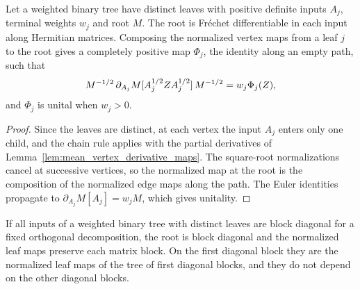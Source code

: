 \begin{theorem}\label{thm:mean_tree_leaf_maps}
    \leanok
    Let a weighted binary tree have distinct leaves with positive definite inputs
    $A_j$, terminal weights $w_j$ and root $M$. The root is Fr\'echet
    differentiable in each input along Hermitian matrices. Composing the
    normalized vertex maps from a leaf $j$ to the root gives a completely
    positive map $\Phi_j$, the identity along an empty path, such that
    \begin{align}
        M^{-1/2}\,\partial_{A_j}M[A_j^{1/2}ZA_j^{1/2}]\,M^{-1/2}=w_j\Phi_j(Z),
        \notag
    \end{align}
    and $\Phi_j$ is unital when $w_j>0$.
\end{theorem}

\begin{proof}\leanok
    Since the leaves are distinct, at each vertex the input $A_j$ enters only one
    child, and the chain rule applies with the partial derivatives of
    Lemma~\ref{lem:mean_vertex_derivative_maps}. The square-root normalizations
    cancel at successive vertices, so the normalized map at the root is the
    composition of the normalized edge maps along the path. The Euler identities
    propagate to $\partial_{A_j}M[A_j]=w_jM$, which gives unitality.
\end{proof}

\begin{theorem}\label{thm:mean_tree_leaf_maps_blocks}
    \leanok
    If all inputs of a weighted binary tree with distinct leaves are block
    diagonal for a fixed orthogonal decomposition, the root is block diagonal and
    the normalized leaf maps preserve each matrix block. On the first diagonal
    block they are the normalized leaf maps of the tree of first diagonal blocks,
    and they do not depend on the other diagonal blocks.
\end{theorem}

